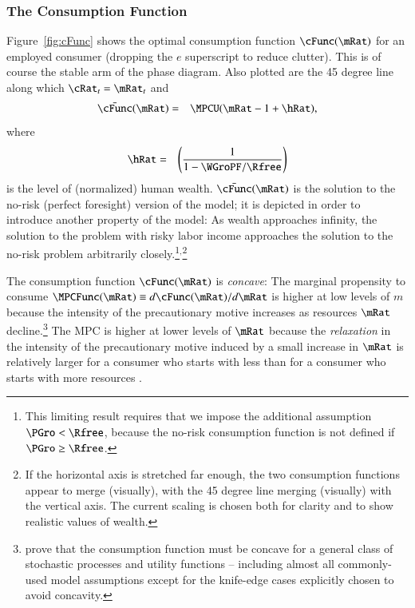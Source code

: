 \documentclass[titlepage,abstract]{\econtex}\newcommand{\texname}{ctDiscrete}
\begin{document}
\subsubsection{The Consumption Function \label{sec:consumptionfunction} }
Figure~\ref{fig:cFunc} shows the optimal consumption function $\cFunc(\mRat)$ for an employed consumer (dropping the $e$ superscript to reduce clutter). This is of course the stable arm of the phase diagram. Also plotted are the 45 degree line along which $\cRat_{t} = \mRat_{t}$ and 
\begin{eqnarray}
\label{eq:norisk-consumption}
  \bar{\cFunc}(\mRat) & = & \MPCU(\mRat-1+\hRat),
\end{eqnarray}
where
\begin{eqnarray*}
  \hRat & = & \left(\frac{1}{1-\WGroPF/\Rfree}\right)
\end{eqnarray*}
is the level of (normalized) human wealth.   $\bar{\cFunc}(\mRat)$ is the solution to the no-risk (perfect foresight) version of the model; it is depicted in order to introduce another property of the model: As wealth approaches infinity, the solution to the problem with risky labor income approaches the solution to the no-risk problem arbitrarily closely.\footnote{This limiting result requires that we impose the additional assumption $\PGro < \Rfree$, because the no-risk consumption function is not defined if $\PGro \geq \Rfree$.
}$^{,}$\footnote{If the horizontal axis is stretched far enough, 
  the two consumption functions appear to merge (visually), 
  with the 45 degree line merging (visually) with the vertical axis. 
  The current scaling is chosen both for clarity and 
  to show realistic values of wealth.}


The consumption function $\cFunc(\mRat)$ is \textit{concave}: The marginal
propensity to consume $\MPCFunc(\mRat) \equiv d \cFunc(\mRat)/d \mRat$
is higher at low levels of $m$ because the intensity of the
precautionary motive increases as resources $\mRat$
decline.\footnote{\cite{carroll&kimball:concavity} prove that the
  consumption function must be concave for a general class of
  stochastic processes and utility functions -- including almost all
  commonly-used model assumptions except for the knife-edge cases
  explicitly chosen to avoid concavity.}  The MPC is higher at lower
levels of $\mRat$ because the \textit{relaxation} in the intensity of the
precautionary motive induced by a small increase in $\mRat$
\citep{kimball:smallandlarge} is relatively larger for a consumer who
starts with less than for a consumer who starts with more resources
\citep{carroll&kimball:concavity}. 
\end{document}
